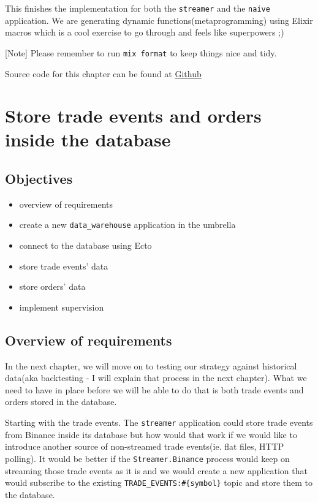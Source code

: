 \documentclass[
  oneside]{book}
\providecommand{\tightlist}{%
  \setlength{\itemsep}{0pt}\setlength{\parskip}{0pt}}
\begin{document}
This finishes the implementation for both the \texttt{streamer} and the \texttt{naive} application. We are generating dynamic functions(metaprogramming) using Elixir macros which is a cool exercise to go through and feels like superpowers ;)

{[}Note{]} Please remember to run \texttt{mix\ format} to keep things nice and tidy.

Source code for this chapter can be found at \href{https://github.com/frathon/create-a-cryptocurrency-trading-bot-in-elixir-source-code/tree/chapter_13}{Github}

\hypertarget{store-trade-events-and-orders-inside-the-database}{%
\chapter{Store trade events and orders inside the database}\label{store-trade-events-and-orders-inside-the-database}}

\hypertarget{objectives-13}{%
\section{Objectives}\label{objectives-13}}

\begin{itemize}
\tightlist
\item
  overview of requirements
\item
  create a new \texttt{data\_warehouse} application in the umbrella
\item
  connect to the database using Ecto
\item
  store trade events' data
\item
  store orders' data
\item
  implement supervision
\end{itemize}

\hypertarget{overview-of-requirements-1}{%
\section{Overview of requirements}\label{overview-of-requirements-1}}

In the next chapter, we will move on to testing our strategy against historical data(aka backtesting - I will explain that process in the next chapter). What we need to have in place before we will be able to do that is both trade events and orders stored in the database.

Starting with the trade events. The \texttt{streamer} application could store trade events from Binance inside its database but how would that work if we would like to introduce another source of non-streamed trade events(ie. flat files, HTTP polling). It would be better if the \texttt{Streamer.Binance} process would keep on streaming those trade events as it is and we would create a new application that would subscribe to the existing \texttt{TRADE\_EVENTS:\#\{symbol\}} topic and store them to the database.
\end{document}

